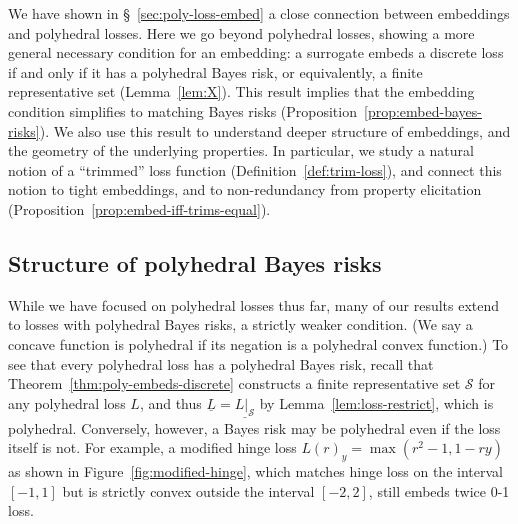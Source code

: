 \documentclass[twoside,11pt]{article}
\newcommand{\Comments}{1}
\newcommand{\mynote}[2]{\ifnum\Comments=1\textcolor{#1}{#2}\fi}
\newcommand{\raf}[1]{\mynote{darkgreen}{[RF: #1]}}
\newcommand{\jessie}[1]{\mynote{teal}{[JF: #1]}}
\newcommand{\Sc}{\mathcal{S}}
\newcommand{\risk}[1]{\underline{#1}}
\begin{document}
We have shown in \S~\ref{sec:poly-loss-embed} a close connection between embeddings and polyhedral losses.
Here we go beyond polyhedral losses, showing a more general necessary condition for an embedding: a surrogate embeds a discrete loss if and only if it has a polyhedral Bayes risk, or equivalently, a finite representative set (Lemma~\ref{lem:X}).
This result implies that the embedding condition simplifies to matching Bayes risks (Proposition~\ref{prop:embed-bayes-risks}).
We also use this result to understand deeper structure of embeddings, and the geometry of the underlying properties. %
In particular, we study a natural notion of a ``trimmed'' loss function (Definition~\ref{def:trim-loss}), and connect this notion to tight embeddings, and to non-redundancy from property elicitation (Proposition~\ref{prop:embed-iff-trims-equal}).
 


\subsection{Structure of polyhedral Bayes risks}

While we have focused on polyhedral losses thus far, many of our results extend to losses with polyhedral Bayes risks, a strictly weaker condition.
(We say a concave function is polyhedral if its negation is a polyhedral convex function.)
To see that every polyhedral loss has a polyhedral Bayes risk, recall that Theorem~\ref{thm:poly-embeds-discrete} constructs a finite representative set $\Sc$ for any polyhedral loss $L$, and thus $\risk{L} = \risk{L|_\Sc}$ by Lemma~\ref{lem:loss-restrict}, which is polyhedral.
Conversely, however, a Bayes risk may be polyhedral even if the loss itself is not.
For example, a modified hinge loss $L(r)_y = \max(r^2-1,1-ry)$
as shown in Figure~\ref{fig:modified-hinge}, which matches hinge loss on the interval $[-1,1]$ but is strictly convex outside the interval $[-2,2]$, still embeds twice 0-1 loss.
\end{document}
